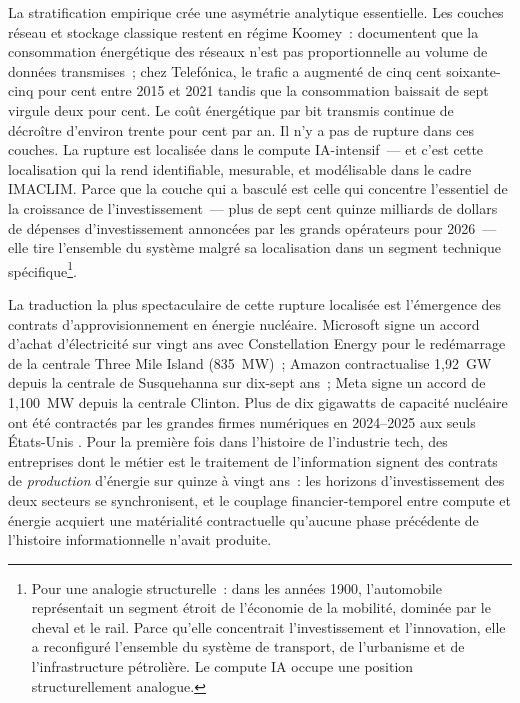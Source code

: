 %
La stratification empirique crée une asymétrie analytique essentielle. Les couches réseau et stockage classique restent en régime Koomey~: \textcite{mytton_network_2024} documentent que la consommation énergétique des réseaux n'est pas proportionnelle au volume de données transmises~; chez Telefónica, le trafic a augmenté de cinq cent soixante-cinq pour cent entre 2015 et 2021 tandis que la consommation baissait de sept virgule deux pour cent. Le coût énergétique par bit transmis continue de décroître d'environ trente pour cent par an. Il n'y a pas de rupture dans ces couches. La rupture est localisée dans le compute IA-intensif~--- et c'est cette localisation qui la rend identifiable, mesurable, et modélisable dans le cadre IMACLIM. Parce que la couche qui a basculé est celle qui concentre l'essentiel de la croissance de l'investissement~--- plus de sept cent quinze milliards de dollars de dépenses d'investissement annoncées par les grands opérateurs pour 2026~--- elle tire l'ensemble du système malgré sa localisation dans un segment technique spécifique\footnote{Pour une analogie structurelle~: dans les années 1900, l'automobile représentait un segment étroit de l'économie de la mobilité, dominée par le cheval et le rail. Parce qu'elle concentrait l'investissement et l'innovation, elle a reconfiguré l'ensemble du système de transport, de l'urbanisme et de l'infrastructure pétrolière. Le compute IA occupe une position structurellement analogue.}.

%
La traduction la plus spectaculaire de cette rupture localisée est l'émergence des contrats d'approvisionnement en énergie nucléaire. Microsoft signe un accord d'achat d'électricité sur vingt ans avec Constellation Energy pour le redémarrage de la centrale Three Mile Island (835~MW)~; Amazon contractualise 1,92~GW depuis la centrale de Susquehanna sur dix-sept ans~; Meta signe un accord de 1,100~MW depuis la centrale Clinton. Plus de dix gigawatts de capacité nucléaire ont été contractés par les grandes firmes numériques en 2024--2025 aux seuls États-Unis \parencite{iea_energy_ai_2025}. Pour la première fois dans l'histoire de l'industrie tech, des entreprises dont le métier est le traitement de l'information signent des contrats de \emph{production} d'énergie sur quinze à vingt ans~: les horizons d'investissement des deux secteurs se synchronisent, et le couplage financier-temporel entre compute et énergie acquiert une matérialité contractuelle qu'aucune phase précédente de l'histoire informationnelle n'avait produite.



